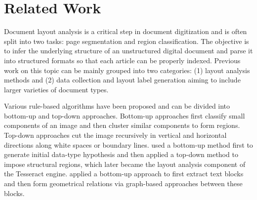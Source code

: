 \documentclass[letterpaper]{article} %
\begin{document}
 


\section{Related Work}
Document layout analysis is a critical step in document digitization and is often split into two tasks: page segmentation and region classification. The objective is to infer the underlying structure of an unstructured digital document and parse it into structured formats so that each article can be properly indexed. Previous work on this topic can be mainly grouped into two categories: (1) layout analysis methods and (2) data collection and layout label generation aiming to include larger varieties of document types. 

Various rule-based algorithms have been proposed and can be divided into bottom-up and top-down approaches. Bottom-up approaches first classify small components of an image and then cluster similar components to form regions. Top-down approaches cut the image recursively in vertical and horizontal directions along white spaces or boundary lines. \cite{DBLP:conf/icdar/Smith09} used a bottom-up method first to generate initial data-type hypothesis and then applied a top-down method to impose structural regions, which later became the layout analysis component of the Tesseract engine. \cite{DBLP:journals/jodl/KlampflGJK14} applied a bottom-up approach to first extract text blocks and then form geometrical relations via graph-based approaches between these blocks.
\end{document}
